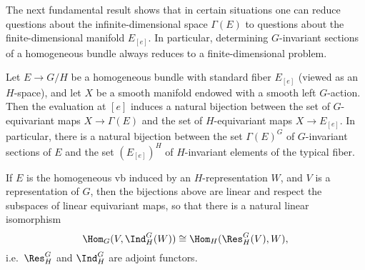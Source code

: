The next fundamental result shows that in certain situations one can reduce questions about the infinite-dimensional space $\Gamma(E)$ to questions about the finite-dimensional manifold $E_{[e]}$. In particular, determining $G$-invariant sections of a homogeneous bundle always reduces to a finite-dimensional problem.

\begin{thm}\label{thm 1.4.4 Cap}
    Let $E\to G\slash H$ be a homogeneous bundle with standard fiber $E_{[e]}$ (viewed as an $H$-space), and let $X$ be a smooth manifold endowed with a smooth left $G$-action. Then the evaluation at $[e]$ induces a natural bijection between the set of $G$-equivariant maps $X\to \Gamma(E)$ and the set of $H$-equivariant maps $X\to E_{[e]}$. In particular, there is a natural bijection between the set $\Gamma(E)^G$ of $G$-invariant sections of $E$ and the set $(E_{[e]})^H$ of $H$-invariant elements of the typical fiber.

    If $E$ is the homogeneous \gls{vb} induced by an $H$-representation $W$, and $V$ is a representation of $G$, then the bijections above are linear and respect the subspaces of linear equivariant maps, so that there is a natural linear isomorphism
    \[\Hom_G(V,\Ind^G_H(W))\cong \Hom_H(\Res^G_H(V),W),\]
    i.e.\ $\Res^G_H$ and $\Ind^G_H$ are adjoint functors.
\end{thm}
